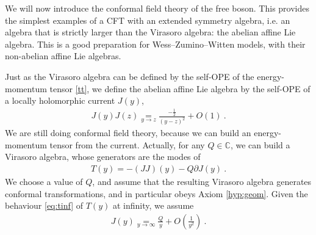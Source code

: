 \documentclass[12pt, a4paper]{article}
\theoremstyle{break}
\begin{document}
We will now introduce the conformal field theory of the free boson. This provides the simplest examples of a CFT with an extended symmetry algebra, i.e. an algebra that is strictly larger than the Virasoro algebra: the abelian affine Lie algebra. This is a good preparation for Wess--Zumino--Witten models, with their non-abelian affine Lie algebras.

Just as the Virasoro algebra can be defined by the self-OPE of the energy-momentum tensor \eqref{tt}, we define the abelian affine Lie algebra by the self-OPE of a locally holomorphic current $J(y)$,
\begin{align}
 J(y)J(z) \underset{y\to z}{=} \frac{-\frac12}{(y-z)^2} + O(1)\ .
\label{jj}
\end{align}
We are still doing conformal field theory, because we can build an energy-momentum tensor from the current. Actually, for any $Q\in\mathbb{C}$, we can build a Virasoro algebra, whose generators are the modes of 
\begin{align}
 T(y) = -(JJ)(y) - Q\partial J(y)\ .
\label{tqz}
\end{align}
We choose a value of $Q$, and assume that the resulting Virasoro algebra generates conformal transformations, and in particular obeys Axiom \ref{hyp:geom}. Given the behaviour \eqref{eq:tinf} of $T(y)$ at infinity, we assume 
\begin{align}
 J(y)\underset{y\to\infty}{=}\frac{Q}{y} +O\left(\frac{1}{y^2}\right) \ .
 \label{eq:ji}
\end{align}
\end{document}
